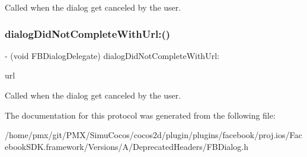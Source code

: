 Called when the dialog get canceled by the user. \mbox{\label{protocolFBDialogDelegate_01-p_ae7fe5c8835467a4dd9b3cb5513991568}} 
\subsubsection{\texorpdfstring{dialog\+Did\+Not\+Complete\+With\+Url\+:()}{dialogDidNotCompleteWithUrl:()}\hspace{0.1cm}{\footnotesize\ttfamily [2/2]}}
{\footnotesize\ttfamily -\/ (void F\+B\+Dialog\+Delegate) dialog\+Did\+Not\+Complete\+With\+Url\+: \begin{DoxyParamCaption}\item[{(N\+S\+U\+RL $\ast$)}]{url }\end{DoxyParamCaption}\hspace{0.3cm}{\ttfamily [optional]}}

Called when the dialog get canceled by the user. 

The documentation for this protocol was generated from the following file\+:\begin{DoxyCompactItemize}
\item 
/home/pmx/git/\+P\+M\+X/\+Simu\+Cocos/cocos2d/plugin/plugins/facebook/proj.\+ios/\+Facebook\+S\+D\+K.\+framework/\+Versions/\+A/\+Deprecated\+Headers/F\+B\+Dialog.\+h\end{DoxyCompactItemize}
